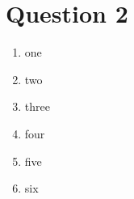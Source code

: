 \documentclass[11pt]{article}
\begin{document}

\section*{Question 2}

\begin{enumerate}[label=(\alph*)]

  \item one

  \item two

  \item three

  \item four

  \item five

  \item six

\end{enumerate}


\end{document}
